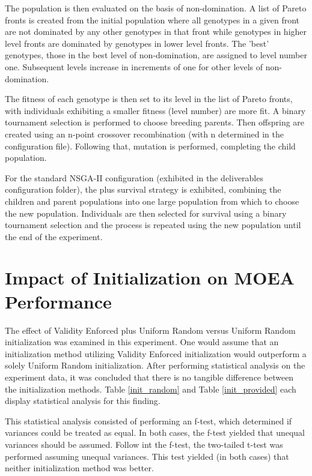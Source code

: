 \documentclass[11pt]{article}
\begin{document}
The population is then evaluated on the basis of non-domination. A list of Pareto fronts is created
from the initial population where all genotypes in a given front are not dominated
by any other genotypes in that front while genotypes in higher level fronts are dominated
by genotypes in lower level fronts. The 'best' genotypes, those in the best level
of non-domination, are assigned to level number one. Subsequent levels increase in
increments of one for other levels of non-domination.

The fitness of each genotype is then set to its level in the list of Pareto fronts, with
individuals exhibiting a smaller fitness (level number) are more fit. A binary tournament selection 
is performed to choose breeding parents. Then offspring are created using an n-point crossover
recombination (with n determined in the configuration file). Following that, mutation is performed,
completing the child population.

For the standard NSGA-II configuration (exhibited in the deliverables configuration folder),
the plus survival strategy is exhibited, combining the children and parent populations into 
one large population from which to choose the new population. Individuals are then selected for 
survival using a binary tournament selection and the process is repeated using the new population
until the end of the experiment.


\section{Impact of Initialization on MOEA Performance}

The effect of Validity Enforced plus Uniform Random versus Uniform Random initialization
was examined in this experiment. One would assume that an initialization method utilizing Validity
Enforced initialization would outperform a solely Uniform Random initialization. After performing 
statistical analysis on the experiment data, it was concluded that there is no tangible difference
between the initialization methods. Table \ref{init_random} and Table \ref{init_provided} 
each display statistical analysis for this finding. 

This statistical analysis consisted of performing an f-test, which determined if variances could be
treated as equal. In both cases, the f-test yielded that unequal variances should be assumed. Follow
int the f-test, the two-tailed t-test was performed assuming unequal variances. This test yielded
(in both cases) that neither initialization method was better.
\end{document}
